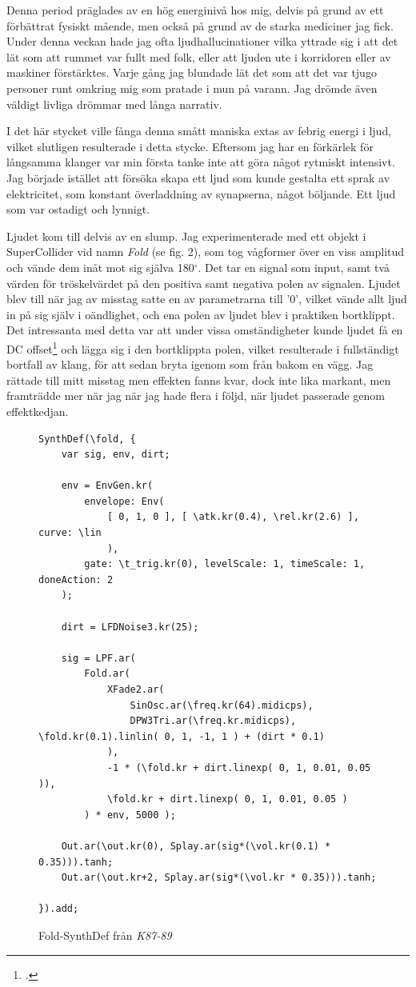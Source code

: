 \documentclass{article}
\renewcommand{\baselinestretch}{1.5}
\begin{document}
Denna period präglades av en hög energinivå hos mig, delvis på grund av ett förbättrat fysiskt mående, men
också på grund av de starka mediciner jag fick. Under denna veckan hade jag ofta ljudhallucinationer vilka
yttrade sig i att det lät som att rummet var fullt med folk, eller att ljuden ute i korridoren eller av
maskiner förstärktes. Varje gång jag blundade lät det som att det var tjugo personer runt omkring mig som
pratade i mun på varann. Jag drömde även väldigt livliga drömmar med långa narrativ. 

I det här stycket ville fånga denna smått maniska extas av febrig energi i ljud, vilket slutligen resulterade
i detta stycke. Eftersom jag har en förkärlek för långsamma klanger var min första tanke inte att göra något
rytmiskt intensivt. Jag började istället att försöka skapa ett ljud som kunde gestalta ett sprak av
elektricitet, som konstant överladdning av synapserna, något böljande. Ett ljud som var ostadigt och lynnigt.

Ljudet kom till delvis av en slump. Jag experimenterade med ett objekt i SuperCollider vid namn \emph{Fold}
(se fig. 2), som
tog vågformer över en viss amplitud och vände dem inåt mot sig själva 180$^{\circ}$. Det tar en signal som
input, samt två värden för tröskelvärdet på den positiva samt negativa polen av signalen. Ljudet blev till när
jag av misstag satte en av parametrarna till '0', vilket vände allt ljud in på sig själv i oändlighet, och ena
polen av ljudet blev i praktiken bortklippt. Det intressanta med detta var att under vissa omständigheter
kunde ljudet få en DC offset\footcite{dc} och lägga sig i den
bortklippta polen, vilket resulterade i fullständigt bortfall av klang, för att sedan bryta igenom som från
bakom en vägg. Jag rättade till mitt misstag men effekten fanns kvar, dock inte lika markant, men framträdde mer
när jag när jag hade flera i följd, när ljudet passerade genom effektkedjan.

\pagebreak
\begin{figure}
\renewcommand{\baselinestretch}{1}
\begin{lstlisting}[style=SuperCollider-IDE]
SynthDef(\fold, {
	var sig, env, dirt;

	env = EnvGen.kr(
		envelope: Env(
			[ 0, 1, 0 ], [ \atk.kr(0.4), \rel.kr(2.6) ], curve: \lin
			), 
		gate: \t_trig.kr(0), levelScale: 1, timeScale: 1, doneAction: 2
	);

	dirt = LFDNoise3.kr(25);

	sig = LPF.ar( 
		Fold.ar(
			XFade2.ar(
				SinOsc.ar(\freq.kr(64).midicps), 
				DPW3Tri.ar(\freq.kr.midicps), \fold.kr(0.1).linlin( 0, 1, -1, 1 ) + (dirt * 0.1)
			),
			-1 * (\fold.kr + dirt.linexp( 0, 1, 0.01, 0.05 )),
			\fold.kr + dirt.linexp( 0, 1, 0.01, 0.05 )
		) * env, 5000 );

	Out.ar(\out.kr(0), Splay.ar(sig*(\vol.kr(0.1) * 0.35))).tanh;
	Out.ar(\out.kr+2, Splay.ar(sig*(\vol.kr * 0.35))).tanh;

}).add;
\end{lstlisting}
\caption{Fold-SynthDef från \emph{K87-89}}
\end{figure}
\renewcommand{\baselinestretch}{1.5}
\end{document}
